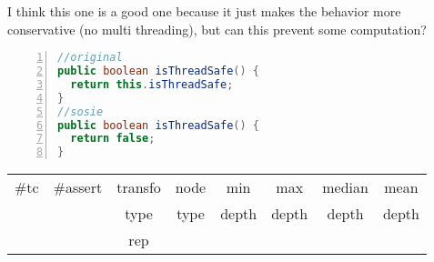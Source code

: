 I think this one is a good one because it just makes the behavior more conservative (no multi threading), but can this prevent some computation?

\begin{minipage}{\columnwidth}
\begin{lstlisting}[caption={Two variants of \texttt{isThreadSafe} in EasyMock},language=java,numbers=left]
//original
public boolean isThreadSafe() {
  return this.isThreadSafe;
}
//sosie
public boolean isThreadSafe() {
  return false;
}
\end{lstlisting}
\tabcolsep=0.11cm
\begin{tabular}{>{\small}c>{\small}c>{\small}c>{\small}c>{\small}c>{\small}c>{\small}c>{\small}c}
\hline
\rowcolor{lightgray} \#tc & \#assert & transfo & node & min & max & median & mean   \\
\rowcolor{lightgray}  & & type & type & depth  & depth & depth & depth  \\ 
\hline
&  & rep &  &  &  &  & \\
\hline
\end{tabular}
\end{minipage}